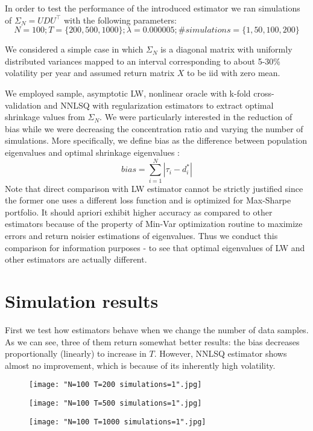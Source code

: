\documentclass{article}
\begin{document}
In order to test the performance of the introduced estimator we ran simulations of $\Sigma_N = U D U^\intercal$ with the following parameters: 
$$
N = 100 ; 
T = \{200,500,1000\} ; 
\lambda = 0.000005 ;
\# simulations = \{1,50,100,200\}
$$

We considered a simple case in which $\Sigma_N$ is a diagonal matrix with uniformly distributed variances mapped to an interval corresponding to about 5-30\% volatility per year and assumed return matrix $X$ to be iid with zero mean. 

We employed sample, asymptotic LW, nonlinear oracle with k-fold cross-validation and NNLSQ with regularization estimators to extract optimal shrinkage values from $\Sigma_N$. We were particularly interested in the reduction of bias while we were decreasing the concentration ratio and varying the number of simulations. More specifically, we define bias as the difference between population eigenvalues and optimal shrinkage eigenvalues : $$ bias = \sum_{i=1}^{N} |\tau_i - d^*_i| $$
Note that direct comparison with LW estimator cannot be strictly justified since the former one uses a different loss function and is optimized for Max-Sharpe portfolio. It should apriori exhibit higher accuracy as compared to other estimators because of the property of Min-Var optimization routine to maximize errors and return noisier estimations of eigenvalues. Thus we conduct this comparison for information purposes - to see that optimal eigenvalues of LW and other estimators are actually different.
\section*{Simulation results}

First we test how estimators behave when we change the number of data samples. As we can see, three of them return somewhat better results: the bias decreases proportionally (linearly) to increase in $T$. However, NNLSQ estimator shows almost no improvement, which is because of its inherently high volatility.

\begin{subfigures}
\begin{figure}[H]
\centering
  \texttt{[image: "N=100 T=200 simulations=1".jpg]}
  \caption{\label{first}}
  \label{pca}
\end{figure}

\begin{figure}[H]
\centering
  \texttt{[image: "N=100 T=500 simulations=1".jpg]}
  \caption{\label{second}}
  \label{pca}
\end{figure}

\begin{figure}[H]
\centering
  \texttt{[image: "N=100 T=1000 simulations=1".jpg]}
  \caption{\label{third}}
  \label{pca}
\end{figure}

\end{subfigures}
\end{document}
